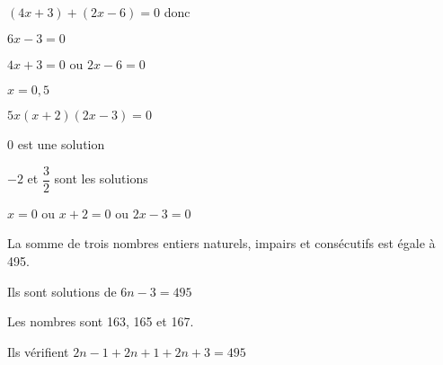 


\begin{QCM}
  \begin{GroupeQCM}
  
    \begin{exercice}
     $(4x+3)+(2x-6)=0$ donc
      \begin{ChoixQCM}{3}
      \item $6x-3=0$
      \item $4x+3=0$ ou $2x-6=0$
      \item $x=0,5$
      \end{ChoixQCM}
\begin{corrige}
   \end{corrige}
    \end{exercice}
    
     \begin{exercice}
      $5x(x+2)(2x-3)=0$
      \begin{ChoixQCM}{3}
      \item 0 est une solution
      \item $-2$ et $\dfrac{3}{2}$ sont les solutions
      \item $x=0$ ou $x+2=0$ ou $2x-3=0$
      \end{ChoixQCM}
\begin{corrige}
   \end{corrige}
    \end{exercice}
    
      \begin{exercice}
    La   somme   de   trois   nombres   entiers naturels, impairs et  consécutifs est égale à 495.
      \begin{ChoixQCM}{3}
      \item Ils sont solutions de $6n-3=495$
      \item Les nombres sont 163, 165 et 167.
      \item Ils vérifient $2n-1+2n+1+2n+3=495$
      \end{ChoixQCM}
\begin{corrige}
   \end{corrige}
    \end{exercice}


\end{GroupeQCM}
\end{QCM}
